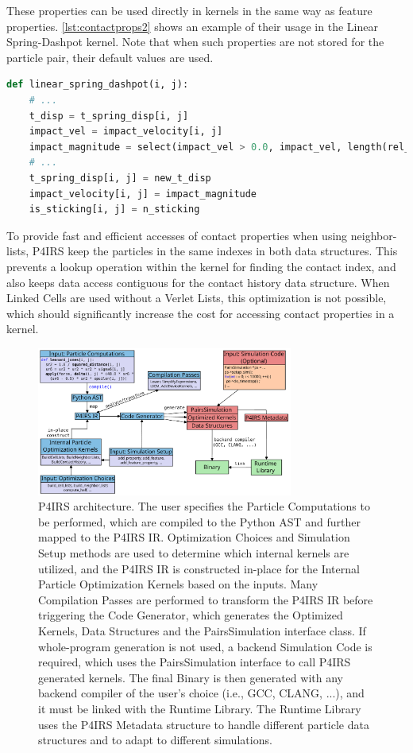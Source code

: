 \documentclass[Afour,sageh,times]{sagej}
\newcommand{\RMchange}[1]{{\color{blue} #1}}
\begin{document}
These properties can be used directly in kernels in the same way as feature properties.
\autoref{lst:contactprops2} shows an example of their usage in the Linear Spring-Dashpot kernel.
Note that when such properties are not stored for the particle pair, their default values are used.

\begin{lstlisting}[language=Python,
		   label={lst:contactprops2},
		   caption={Contact properties usage example.}]
def linear_spring_dashpot(i, j):
    # ...
    t_disp = t_spring_disp[i, j]
    impact_vel = impact_velocity[i, j]
    impact_magnitude = select(impact_vel > 0.0, impact_vel, length(rel_vel))
    # ...
    t_spring_disp[i, j] = new_t_disp
    impact_velocity[i, j] = impact_magnitude
    is_sticking[i, j] = n_sticking
\end{lstlisting}

To provide fast and efficient accesses of contact properties when using neighbor-lists, P4IRS keep the particles in the same indexes in both data structures.
This prevents a lookup operation within the kernel for finding the contact index, and also keeps data access contiguous for the contact history data structure.
When Linked Cells are used without a Verlet Lists, this optimization is not possible, which should significantly increase the cost for accessing contact properties in a kernel.

\begin{figure}[htb]
  \centering
  \includegraphics[width=0.75\textwidth]{pairs_architecture.pdf}
  \caption{\RMchange{P4IRS architecture. The user specifies the Particle Computations to be performed, which are compiled to the Python AST and further mapped to the P4IRS IR. Optimization Choices and Simulation Setup methods are used to determine which internal kernels are utilized, and the P4IRS IR is constructed in-place for the Internal Particle Optimization Kernels based on the inputs. Many Compilation Passes are performed to transform the P4IRS IR before triggering the Code Generator, which generates the Optimized Kernels, Data Structures and the PairsSimulation interface class. If whole-program generation is not used, a backend Simulation Code is required, which uses the PairsSimulation interface to call P4IRS generated kernels. The final Binary is then generated with any backend compiler of the user's choice (i.e., GCC, CLANG, ...), and it must be linked with the Runtime Library. The Runtime Library uses the P4IRS Metadata structure to handle different particle data structures and to adapt to different simulations.}}
  \label{fig:pairs_arch}
\end{figure}
\end{document}
